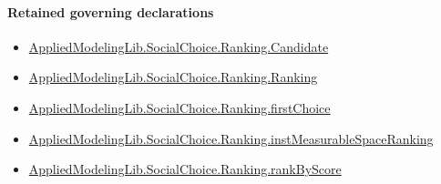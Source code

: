 \documentclass[10pt]{article}
\begin{document}
\paragraph{Retained governing declarations}
\begin{itemize}\raggedright
\item \hyperlink{library-prerequisite-8c0e6c25845ae78a}{Applied\allowbreak{}Modeling\allowbreak{}Lib.\allowbreak{}Social\allowbreak{}Choice.\allowbreak{}Ranking.\allowbreak{}Candidate}
\item \hyperlink{library-prerequisite-5cde54446d1ae021}{Applied\allowbreak{}Modeling\allowbreak{}Lib.\allowbreak{}Social\allowbreak{}Choice.\allowbreak{}Ranking.\allowbreak{}Ranking}
\item \hyperlink{governing-declaration-08e457479ee6cf15}{Applied\allowbreak{}Modeling\allowbreak{}Lib.\allowbreak{}Social\allowbreak{}Choice.\allowbreak{}Ranking.\allowbreak{}first\allowbreak{}Choice}
\item \hyperlink{governing-declaration-30ca9c740ef703ec}{Applied\allowbreak{}Modeling\allowbreak{}Lib.\allowbreak{}Social\allowbreak{}Choice.\allowbreak{}Ranking.\allowbreak{}inst\allowbreak{}Measurable\allowbreak{}Space\allowbreak{}Ranking}
\item \hyperlink{governing-declaration-c2e98278351275b0}{Applied\allowbreak{}Modeling\allowbreak{}Lib.\allowbreak{}Social\allowbreak{}Choice.\allowbreak{}Ranking.\allowbreak{}rank\allowbreak{}By\allowbreak{}Score}
\end{itemize}
\end{document}

